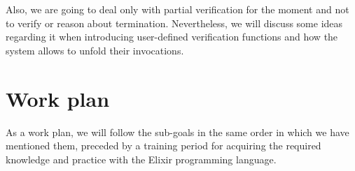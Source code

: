 Also, we are going to deal only with partial verification for the moment and not
to verify or reason about termination. Nevertheless, we will discuss some ideas 
regarding it when introducing user-defined verification functions and how the 
system allows to unfold their invocations.  

\section{Work plan}

As a work plan, we will follow the sub-goals in the same order in which we have
mentioned them, preceded by a training period for acquiring the required
knowledge and practice with the Elixir programming language.
